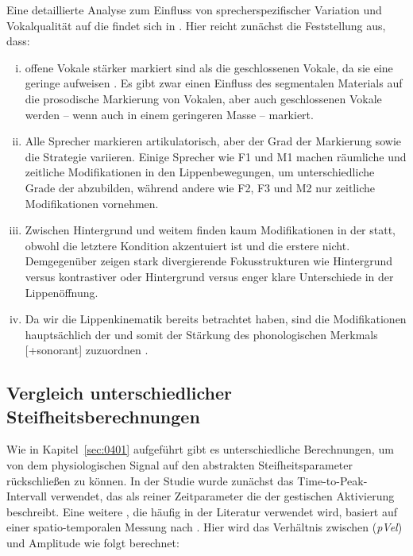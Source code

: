  
Eine detaillierte Analyse zum Einfluss von sprecherspezifischer Variation und Vokalqualität auf die  findet sich in \citet{Mücke2014b}. Hier reicht zunächst die Feststellung aus, dass:

\begin{enumerate}[(i)]
	\item offene Vokale stärker markiert sind als die geschlossenen Vokale, da sie eine geringe  aufweisen \citep[vgl. auch][]{Harrington2000, Tabain2003a, Tabain2003b}. Es gibt zwar einen Einfluss des segmentalen Materials auf die prosodische Markierung von Vokalen, aber auch geschlossenen Vokale werden -- wenn auch in einem geringeren Masse -- markiert.
	\item Alle Sprecher markieren artikulatorisch, aber der Grad der Markierung sowie die Strategie variieren. Einige Sprecher wie F1 und M1 machen räumliche und zeitliche Modifikationen in den Lippenbewegungen, um unterschiedliche Grade der  abzubilden, während andere wie F2, F3 und M2 nur zeitliche Modifikationen vornehmen.
	\item Zwischen Hintergrund und weitem  finden kaum Modifikationen in der  statt, obwohl die letztere Kondition akzentuiert ist und die erstere nicht. Demgegenüber zeigen stark divergierende Fokusstrukturen wie Hintergrund versus kontrastiver  oder Hintergrund versus enger  klare Unterschiede in der Lippenöffnung.
	\item Da wir die Lippenkinematik bereits betrachtet haben, sind die Modifikationen hauptsächlich der  und somit der Stärkung des phonologischen Merkmals [+sonorant] zuzuordnen \citep[vgl.][]{DeJong1995, Harrington2000, Cho2005a}.
\end{enumerate}


\subsection{Vergleich unterschiedlicher Steifheitsberechnungen}
\label{subsec:060304}

Wie in Kapitel~\ref{sec:0401} aufgeführt gibt es unterschiedliche Berechnungen, um von dem physiologischen Signal auf den abstrakten Steifheitsparameter rückschließen zu können. In der Studie wurde zunächst das Time-to-Peak-Intervall verwendet, das als reiner Zeitparameter die  der gestischen Aktivierung beschreibt. Eine weitere , die häufig in der Literatur verwendet wird, basiert auf einer spatio-temporalen Messung nach \citet{Munhall1985}. Hier wird das Verhältnis zwischen  (\textit{pVel}) und Amplitude wie folgt berechnet: 

